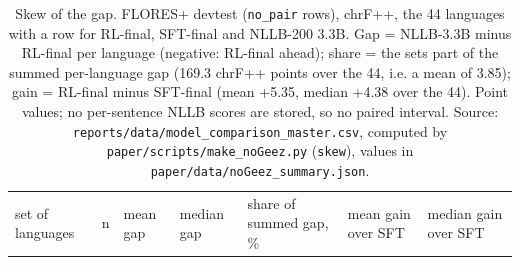 \begin{table}[t]
\centering
\footnotesize
\setlength{\tabcolsep}{3pt}
\caption{Skew of the gap. FLORES+ devtest (\texttt{no\_pair} rows), chrF++, the 44 languages with a row for RL-final, SFT-final and NLLB-200 3.3B. Gap = NLLB-3.3B minus RL-final per language (negative: RL-final ahead); share = the set\textquotesingle s part of the summed per-language gap (169.3 chrF++ points over the 44, i.e. a mean of 3.85); gain = RL-final minus SFT-final (mean +5.35, median +4.38 over the 44). Point values; no per-sentence NLLB scores are stored, so no paired interval. Source: \texttt{reports/data/model\_comparison\_master.csv}, computed by \texttt{paper/scripts/make\_noGeez.py} (\texttt{skew}), values in \texttt{paper/data/noGeez\_summary.json}.}
\label{tab:t_skew_summary}
{\def\LTcaptype{none} %
\begin{tabular}{@{}
  >{\raggedright\arraybackslash}p{}
  >{\raggedleft\arraybackslash}p{}
  >{\raggedleft\arraybackslash}p{}
  >{\raggedleft\arraybackslash}p{}
  >{\raggedleft\arraybackslash}p{}
  >{\raggedleft\arraybackslash}p{}
  >{\raggedleft\arraybackslash}p{}@{}}
\toprule
\begin{minipage}[b]{\linewidth}\raggedright
set of languages
\end{minipage} & \begin{minipage}[b]{\linewidth}\raggedleft
n
\end{minipage} & \begin{minipage}[b]{\linewidth}\raggedleft
mean gap
\end{minipage} & \begin{minipage}[b]{\linewidth}\raggedleft
median gap
\end{minipage} & \begin{minipage}[b]{\linewidth}\raggedleft
share of summed gap, \%
\end{minipage} & \begin{minipage}[b]{\linewidth}\raggedleft
mean gain over SFT
\end{minipage} & \begin{minipage}[b]{\linewidth}\raggedleft
median gain over SFT
\end{minipage} \\

\end{tabular}}
\end{table}
